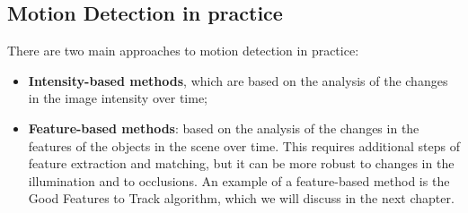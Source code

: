 \subsection{Motion Detection in practice}
There are two main approaches to motion detection in practice:
\begin{itemize}
    \item \textbf{Intensity-based methods}, which are based on the analysis of the changes in the image intensity over time;
    \item \textbf{Feature-based methods}: based on the analysis of the changes in the features of the objects in the scene over time.
    This requires additional steps of feature extraction and matching, but it can be more robust to changes in the illumination and to occlusions.
    An example of a feature-based method is the Good Features to Track algorithm, which we will discuss in the next chapter.
\end{itemize}

